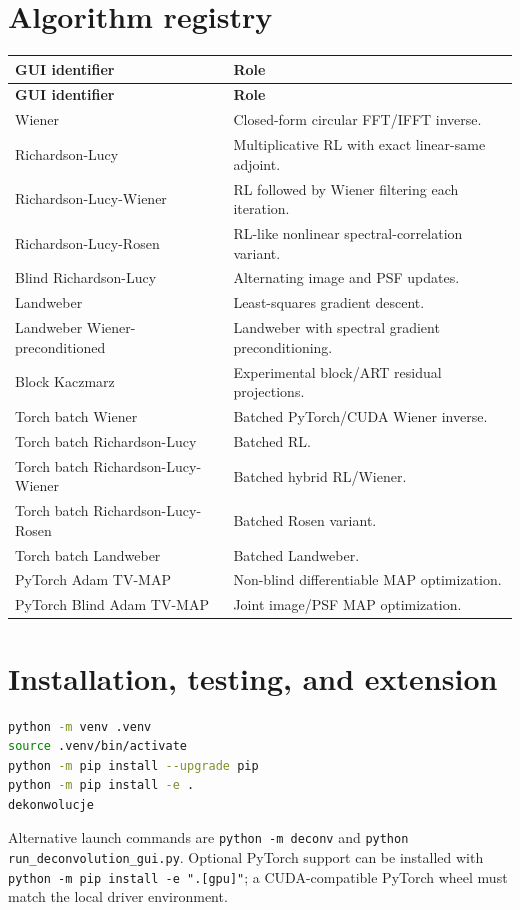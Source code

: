 \documentclass[10pt,a4paper]{article}
\newcommand{\code}[1]{\texttt{#1}}
\begin{document}
\section{Algorithm registry}
\begin{longtable}{>{\raggedright\arraybackslash}p{}>{\raggedright\arraybackslash}p{}}
\toprule\textbf{GUI identifier}&\textbf{Role}\\\midrule\endfirsthead
\toprule\textbf{GUI identifier}&\textbf{Role}\\\midrule\endhead
Wiener&Closed-form circular FFT/IFFT inverse.\\
Richardson-Lucy&Multiplicative RL with exact linear-same adjoint.\\
Richardson-Lucy-Wiener&RL followed by Wiener filtering each iteration.\\
Richardson-Lucy-Rosen&RL-like nonlinear spectral-correlation variant.\\
Blind Richardson-Lucy&Alternating image and PSF updates.\\
Landweber&Least-squares gradient descent.\\
Landweber Wiener-preconditioned&Landweber with spectral gradient preconditioning.\\
Block Kaczmarz&Experimental block/ART residual projections.\\
Torch batch Wiener&Batched PyTorch/CUDA Wiener inverse.\\
Torch batch Richardson-Lucy&Batched RL.\\
Torch batch Richardson-Lucy-Wiener&Batched hybrid RL/Wiener.\\
Torch batch Richardson-Lucy-Rosen&Batched Rosen variant.\\
Torch batch Landweber&Batched Landweber.\\
PyTorch Adam TV-MAP&Non-blind differentiable MAP optimization.\\
PyTorch Blind Adam TV-MAP&Joint image/PSF MAP optimization.\\\bottomrule
\end{longtable}

\section{Installation, testing, and extension}
\begin{lstlisting}[language=bash]
python -m venv .venv
source .venv/bin/activate
python -m pip install --upgrade pip
python -m pip install -e .
dekonwolucje
\end{lstlisting}
Alternative launch commands are \code{python -m deconv} and \code{python run\_deconvolution\_gui.py}. Optional PyTorch support can be installed with \code{python -m pip install -e ".[gpu]"}; a CUDA-compatible PyTorch wheel must match the local driver environment.
\end{document}
